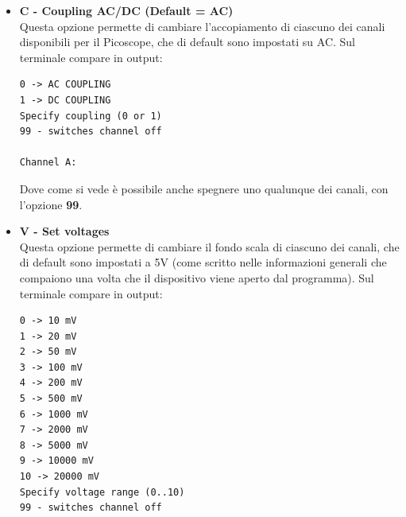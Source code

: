 \documentclass[a4paper]{article}
\begin{document}
\begin{itemize}
\item \textbf{C - Coupling AC/DC (Default = AC)}\\
Questa opzione permette di cambiare l'accopiamento di ciascuno dei canali disponibili per il Picoscope, che di default sono impostati su AC. Sul terminale compare in output:
\begin{tcolorbox}
\begin{Verbatim}[tabsize = 4]
0 -> AC COUPLING
1 -> DC COUPLING
Specify coupling (0 or 1)
99 - switches channel off

Channel A:
\end{Verbatim}
\end{tcolorbox}
Dove come si vede è possibile anche spegnere uno qualunque dei canali, con l'opzione \textbf{99}.
\item \textbf{V - Set voltages}\\
Questa opzione permette di cambiare il fondo scala di ciascuno dei canali, che di default sono impostati a 5V (come scritto nelle informazioni generali che compaiono una volta che il dispositivo viene aperto dal programma). Sul terminale compare in output:
\begin{tcolorbox}
\begin{Verbatim}[tabsize = 4]
0 -> 10 mV
1 -> 20 mV
2 -> 50 mV
3 -> 100 mV
4 -> 200 mV
5 -> 500 mV
6 -> 1000 mV
7 -> 2000 mV
8 -> 5000 mV
9 -> 10000 mV
10 -> 20000 mV
Specify voltage range (0..10)
99 - switches channel off


\end{Verbatim}
\end{tcolorbox}
\end{itemize}
\end{document}
